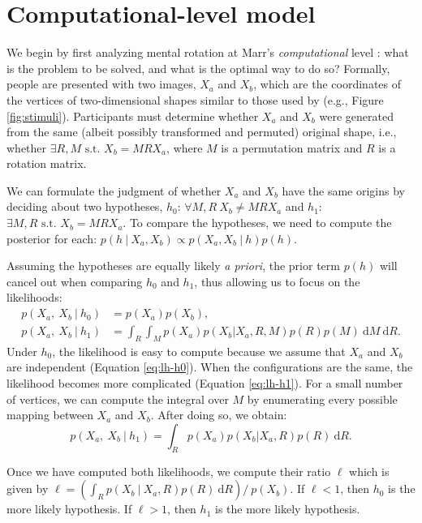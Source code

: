 \documentclass{article} %
\begin{document}
\section{Computational-level model}

We begin by first analyzing mental rotation at Marr's
\textit{computational} level \cite{Marr:1983to}: what is the problem
to be solved, and what is the optimal way to do so?  Formally, people
are presented with two images, $X_a$ and $X_b$, which are the
coordinates of the vertices of two-dimensional shapes similar to those
used by \cite{Cooper:1975wp} (e.g., Figure
\ref{fig:stimuli}). Participants must determine whether $X_a$ and
$X_b$ were generated from the same (albeit possibly transformed and
permuted) original shape, i.e., whether $\exists R,M\textrm{ s.t. }
X_b=MRX_a$, where $M$ is a permutation matrix and $R$ is a rotation
matrix.

We can formulate the judgment of whether $X_a$ and $X_b$ have the same
origins by deciding about two hypotheses, $h_0$: $\forall M,R\ X_b\neq
MRX_a$ and $h_1$: $\exists M,R\textrm{ s.t. } X_b=MRX_a$.  To compare
the hypotheses, we need to compute the posterior for each: $p(h\
\vert\ X_a, X_b)\propto p(X_a, X_b\ \vert\ h)p(h)$.

Assuming the hypotheses are equally likely \textit{a priori}, the
prior term $p(h)$ will cancel out when comparing $h_0$ and $h_1$, thus
allowing us to focus on the likelihoods:
\begin{align}
  p(X_a,\ X_b\ \vert \ h_0)&=p(X_a)p(X_b), \label{eq:lh-h0}\\
  p(X_a,\ X_b\ \vert \ h_1)&=\int_R\int_M p(X_a) p(X_b\vert X_a,R,M) p(R) p(M)\ \mathrm{d}M\ \mathrm{d}R. \label{eq:lh-h1}
\end{align}
Under $h_0$, the likelihood is easy to compute because we assume that
$X_a$ and $X_b$ are independent (Equation \ref{eq:lh-h0}). When the
configurations are the same, the likelihood becomes more complicated
(Equation \ref{eq:lh-h1}). For a small number of vertices, we can
compute the integral over $M$ by enumerating every possible mapping
between $X_a$ and $X_b$. After doing so, we obtain:
\begin{equation} 
  p(X_a,\ X_b\ \vert \ h_1)=\int_R p(X_a) p(X_b\vert X_a,R) p(R)\ \mathrm{d}R.
\end{equation}

Once we have computed both likelihoods, we compute their ratio $\ell$
which is given by $\ell=\left(\int_R p(X_b\ \vert\ X_a, R)p(R)\
  \mathrm{d}R\right) /\ p(X_b)$. If $\ell<1$, then $h_0$ is the more
likely hypothesis. If $\ell>1$, then $h_1$ is the more likely
hypothesis.
\end{document}
